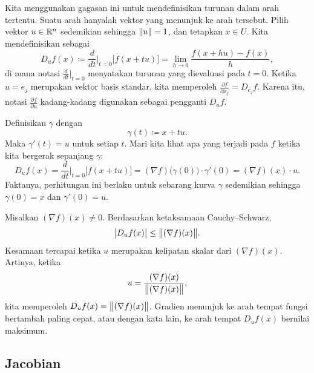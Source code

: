 Kita menggunakan gagasan ini untuk mendefinisikan turunan dalam arah tertentu.  Suatu arah
hanyalah vektor yang menunjuk ke arah tersebut.  Pilih vektor $u \in {\mathbb{R}}^n$
sedemikian sehingga $\lVert {u} \rVert = 1$, dan tetapkan $x \in U$.
Kita mendefinisikan
\emph{} sebagai
\begin{equation*}
D_u f (x) \coloneqq \frac{d}{dt}\Big|_{t=0} \bigl[ f(x+tu) \bigr] =
\lim_{h\to 0}
\frac{f(x+hu)-f(x)}{h} ,
\end{equation*}
di mana notasi
$\frac{d}{dt}\big|_{t=0}$ menyatakan turunan yang dievaluasi pada $t=0$.
Ketika $u=e_j$ merupakan vektor basis standar, kita memperoleh
$\frac{\partial f}{\partial x_j} = D_{e_j} f$.
Karena itu, notasi $\frac{\partial f}{\partial u}$ kadang-kadang
digunakan sebagai pengganti $D_u f$.

Definisikan $\gamma$ dengan
\begin{equation*}
\gamma(t) \coloneqq x + tu .
\end{equation*}
Maka $\gamma'(t) = u$ untuk setiap $t$.
Mari kita lihat apa yang terjadi pada $f$ ketika kita bergerak sepanjang $\gamma$:
\begin{equation*}
D_u f (x) =
\frac{d}{dt}\Big|_{t=0} \bigl[ f(x+tu) \bigr] =
(\nabla f) \bigl(\gamma(0)\bigr) \cdot \gamma'(0)
=
(\nabla f) (x) \cdot u .
\end{equation*}
Faktanya, perhitungan ini berlaku untuk sebarang kurva $\gamma$ sedemikian sehingga
$\gamma(0) = x$ dan $\gamma'(0) = u$.

Misalkan $(\nabla f)(x) \neq 0$.
Berdasarkan ketaksamaan Cauchy--Schwarz,
\begin{equation*}
\bigl\lvert {D_u f(x)} \bigr\rvert \leq \bigl\lVert {(\nabla f)(x)} \bigr\rVert .
\end{equation*}
Kesamaan tercapai ketika $u$ merupakan kelipatan skalar dari
$(\nabla f)(x)$.  Artinya, ketika
\begin{equation*}
u = 
\frac{(\nabla f)(x)}{\bigl\lVert {(\nabla f)(x)} \bigr\rVert} ,
\end{equation*}
kita memperoleh $D_u f(x) = \bigl\lVert {(\nabla f)(x)} \bigr\rVert$.
Gradien menunjuk ke arah tempat
fungsi bertambah paling cepat, atau dengan kata lain,
ke arah tempat $D_u f(x)$ bernilai maksimum.

\subsection{Jacobian}

